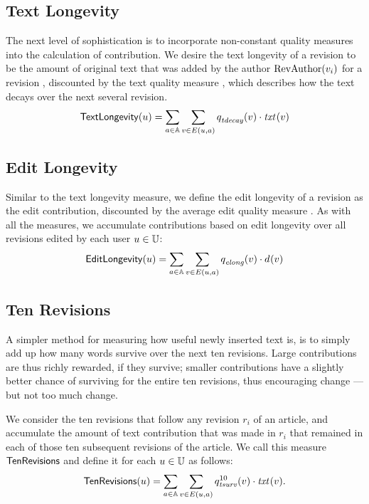 \subsection{Text Longevity}

\noindent
The next level of sophistication is to incorporate
non-constant quality measures into the calculation of contribution.
We desire the text longevity of a revision to be
the amount of original text that was
added by the author $\mathrm{RevAuthor}(v_{i})$
for a revision , discounted by the
text quality measure , which describes
how the text decays over the next several revision.
%
\[
\textlong(u) = 
\sum_{a \in \articles} \sum_{v \in E(u, a)} \quality{tdecay}{}{v}
        \cdot \txt{}{v}
\]
%

\subsection{Edit Longevity}

\noindent
Similar to the text longevity measure, we define the edit longevity
of a revision  as the edit contribution, discounted by the 
average edit quality measure .
As with all the measures, we accumulate contributions based on 
edit longevity over all revisions edited by each user $u \in \mathbb{U}$:
%
\[
\editlong(u) = \sum_{a \in \articles} \sum_{v \in E(u, a)} 
\quality{elong}{}{v} \cdot \dist{}{v}
\]
%

\subsection{Ten Revisions}

\noindent
A simpler method for measuring how useful newly inserted
text is, is to simply add up how many words survive over
the next ten revisions.
Large contributions are thus richly rewarded, if they survive;
smaller contributions have a slightly better chance of surviving
for the entire ten revisions, thus encouraging change ---
but not too much change.

We consider the ten revisions that follow any revision $r_i$ of an 
article, and accumulate the amount of text contribution that was made 
in $r_i$ that remained in each of those ten subsequent revisions
of the article.
We call this measure $\mathsf{TenRevisions}$ and define it for each
$u \in \mathbb{U}$ as follows:
%
\begin{gather*}
\tenrevs(u) = 
\sum_{a \in \articles} \sum_{v \in E(u, a)} \quality{tsurv}{10}{v}
        \cdot \txt{}{v}.
\end{gather*}

